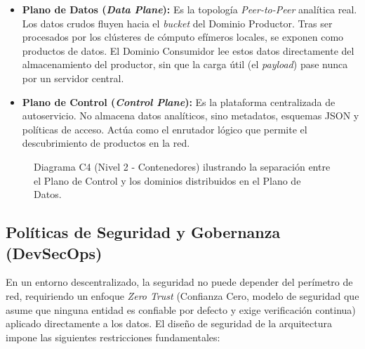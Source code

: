 \documentclass[12pt, a4paper]{article}
\begin{document}
\begin{itemize}
    \item \textbf{Plano de Datos (\textit{Data Plane}):} Es la topología \textit{Peer-to-Peer} analítica real. Los datos crudos fluyen hacia el \textit{bucket} del Dominio Productor. Tras ser procesados por los clústeres de cómputo efímeros locales, se exponen como productos de datos. El Dominio Consumidor lee estos datos directamente del almacenamiento del productor, sin que la carga útil (el \textit{payload}) pase nunca por un servidor central.
    \item \textbf{Plano de Control (\textit{Control Plane}):} Es la plataforma centralizada de autoservicio. No almacena datos analíticos, sino metadatos, esquemas JSON y políticas de acceso. Actúa como el enrutador lógico que permite el descubrimiento de productos en la red.
\end{itemize}

\begin{figure}[h]
    \centering
    \vspace{6cm} %
    \caption{Diagrama C4 (Nivel 2 - Contenedores) ilustrando la separación entre el Plano de Control y los dominios distribuidos en el Plano de Datos.}
    \label{fig:arquitectura_red}
\end{figure}

\subsection{Políticas de Seguridad y Gobernanza (DevSecOps)}

En un entorno descentralizado, la seguridad no puede depender del perímetro de red, requiriendo un enfoque \textit{Zero Trust} (Confianza Cero, modelo de seguridad que asume que ninguna entidad es confiable por defecto y exige verificación continua) aplicado directamente a los datos. El diseño de seguridad de la arquitectura impone las siguientes restricciones fundamentales:
\end{document}
